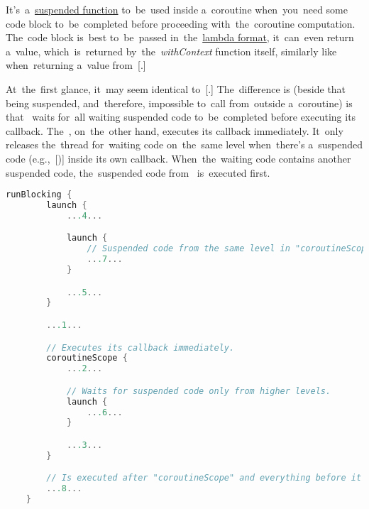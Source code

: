 \label{kotlincoroutinescopefun}
It's~a~\hyperref[kotlinsuspendfunction]{suspended function} to~be~used inside a~coroutine when~you~need some code block to~be~completed before proceeding with~the~coroutine computation.
The~code block is~best to~be~passed in~the~\hyperref[kotlinlambda]{lambda format}, it~can~even return a~value, which~is~returned \mbox{by the \textit{withContext}} function itself, similarly like when~returning a~value from~[.]

At~the~first glance, it~may seem identical to~[.]
The~difference is (beside that~ being suspended, and~therefore, impossible to~call from~outside a~coroutine) is that~ waits for~all waiting suspended code to~be~completed before executing its callback.
The~, on~the~other hand, executes its callback immediately.
It~only releases the~thread for~waiting code on~the~same level when~there's a~suspended code \mbox{(e.g.,}~[)] inside its own callback.
When~the~waiting code contains another suspended code, the~suspended code from~ is~executed first.

\begin{lstlisting}[language=Kotlin, title={Numbers represent the~order of~execution}]
    runBlocking {
        launch {
            ...4...

            launch {
                // Suspended code from the same level in "coroutineScope" is executed first.
                ...7...
            }

            ...5...
        }

        ...1...

        // Executes its callback immediately.
        coroutineScope {
            ...2...

            // Waits for suspended code only from higher levels.
            launch {
                ...6...
            }

            ...3...
        }

        // Is executed after "coroutineScope" and everything before it finishes.
        ...8...
    }
\end{lstlisting}

